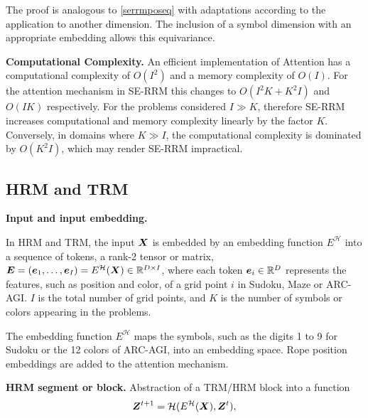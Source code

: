 \documentclass{article}
\theoremstyle{plain}
\theoremstyle{definition}
\theoremstyle{remark}
\renewcommand{\paragraph}[1]{\textbf{#1}\;}
\begin{document}
The proof is analogous to \cref{serrmposeq} with adaptations according to the application to another dimension. The inclusion of a symbol dimension with an appropriate embedding allows this equivariance.  

\paragraph{Computational Complexity.}
An efficient implementation of Attention \citep{flashattn} has a computational complexity of $O(I^2)$ and a memory complexity of $O(I)$. For the attention mechanism in SE-RRM this changes to $O(I^2K + K^2I)$ and $O(IK)$ respectively. For the problems considered $I \gg K$, therefore SE-RRM increases computational and memory complexity linearly by the factor $K$.  Conversely, in domains where $K \gg I$, the computational complexity is dominated by 
$O(K^2I)$, which may render SE-RRM impractical.


\iffalse


\subsection{HRM and TRM}

\paragraph{Input and input embedding.}

In HRM and TRM, the input $\bm{X}$ is embedded by an embedding function $E^{\mathcal H}$  into a sequence of tokens, a rank-2 tensor or matrix, $\bm{E}=(\bm{e}_1,\ldots,\bm{e}_I)=E^{\mathcal H}(\bm{X}) \in \mathbb{R}^{D \times I}$, where each token $\bm{e}_i \in \mathbb{R}^D$ represents the features, such as position and color, of a grid point $i$  in Sudoku, Maze or ARC-AGI. $I$ is the total number of grid points, and  $K$ is the number of symbols or colors appearing in the problems.

The embedding function $E^{\mathcal H}$ maps the symbols, such as the digits 1 to 9 for Sudoku or  the 12 colors of ARC-AGI, into an embedding space. Rope position embeddings \citep{heo2024rotary} are added to the attention mechanism.

\paragraph{HRM segment or block.}
Abstraction of a TRM/HRM block into 
a function 
\begin{align}
\bm{Z}^{t+1} = \mathcal H(E^{\mathcal H}(\bm{X}), \bm{Z}^t),
\end{align}
\end{document}
